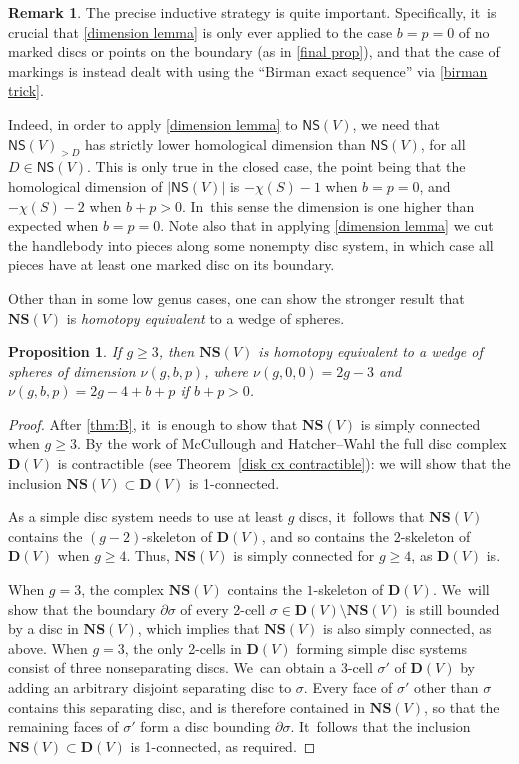 \documentclass[JEP,XML,SOM,Unicode,NoFloatCountersInSection,published]{cedram}
\theoremstyle{plain}
\newtheorem{prop}[thm]{Proposition}
\theoremstyle{definition}
\newtheorem{rem}[thm]{Remark}
\newcommand{\NS}{\mathsf{NS}}
\newcommand{\compNS}{\mathbf{NS}}
\newcommand{\compD}{\mathbf{D}}
\begin{document}
\begin{rem}The precise inductive strategy is quite important. Specifically, it~is crucial that \cref{dimension lemma} is only ever applied to the case $b=p=0$ of no marked discs or points on the boundary (as in \cref{final prop}), and that the case of markings is instead dealt with using the ``Birman exact sequence'' via \cref{birman trick}.

Indeed, in order to apply \cref{dimension lemma} to $\NS(V)$, we need that $\NS(V)_{>D}$ has strictly lower homological dimension than $\NS(V)$, for all $D \in \NS(V)$. This is only true in the closed case, the point being that the homological dimension of $|\NS(V)|$ is $-\chi(S)-1$ when $b=p=0$, and $-\chi(S)-2$ when $b+p>0$. In~this sense the dimension is one higher than expected when $b=p=0$.
Note also that in applying \cref{dimension lemma} we cut the handlebody into pieces along some nonempty disc system, in which case all pieces have at least one marked disc on its boundary.
\end{rem}

Other than in some low genus cases, one can show the stronger result that $\compNS(V)$ is \emph{homotopy equivalent} to a wedge of spheres.

\begin{prop} \label{prop: simple connectivity}
If $g \geq 3$, then $\compNS(V)$ is homotopy equivalent to a wedge of spheres of dimension $\nu(g,b,p)$, where $\nu(g,0,0) = 2g-3$ and $\nu(g,b,p) = 2g-4+b+p$ if $b+p>0$.
\end{prop}

\begin{proof}
After \cref{thm:B}, it~is enough to show that $\compNS(V)$ is simply connected when $g \geq 3$. By the work of McCullough \cite{mccullough} and Hatcher--Wahl \cite{hatcherwahl} the full disc complex $\compD(V)$ is contractible (see Theorem~\ref{disk cx contractible}): we will show that the inclusion $\compNS(V) \subset \compD(V)$ is 1-connected.

As a simple disc system needs to use at least $g$ discs, it~follows that $\compNS(V)$ contains the $(g-2)$-skeleton of $\compD(V)$, and so contains the $2$-skeleton of $\compD(V)$ when $g \geq 4$. Thus, $\compNS(V)$ is simply connected for $g \geq 4$, as $\compD(V)$ is.

When $g=3$, the complex $\compNS(V)$ contains the $1$-skeleton of $\compD(V)$. We~will show that the boundary $\partial \sigma$ of every 2-cell $\sigma \in \compD(V) \setminus \compNS(V)$ is still bounded by a disc in $\compNS(V)$, which implies that $\compNS(V)$ is also simply connected, as above. When $g=3$, the only 2-cells in $\compD(V)$ forming simple disc systems consist of three nonseparating discs. We~can obtain a 3-cell $\sigma'$ of $\compD(V)$ by adding an arbitrary disjoint separating disc to $\sigma$. Every face of $\sigma'$ other than $\sigma$ contains this separating disc, and is therefore contained in $\compNS(V)$, so that the remaining faces of $\sigma'$ form a disc bounding $\partial \sigma$. It~follows that the inclusion $\compNS(V) \subset \compD(V)$ is 1-connected, as required.
\end{proof}
\end{document}
